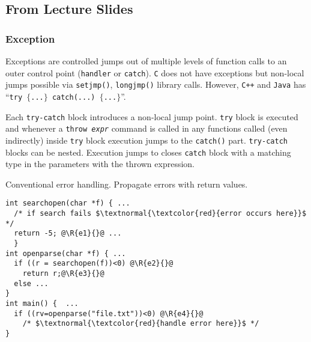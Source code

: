 \vspace*{\fill}
\columnbreak

\subsection{From Lecture Slides}
\label{subsec:from-lecture-slides}

\subsubsection{Exception}
\label{subsubsec:slide-exception}

Exceptions are controlled jumps out of multiple levels of function calls to an outer control point (\texttt{handler} or \texttt{catch}). \texttt{C} does not have exceptions but non-local jumps possible via \texttt{setjmp()}, \texttt{longjmp()} library calls. However, \texttt{C++} and \texttt{Java} has ``\texttt{try $\{$...$\}$ catch(...) $\{$...$\}$}''.

Each \texttt{try-catch} block introduces a non-local jump point. \texttt{try} block is executed and whenever a \texttt{throw {\em expr\/}} command is called in any functions called (even indirectly) inside \texttt{try}  block execution jumps to the \texttt{catch()} part. \texttt{try-catch} blocks can be nested. Execution jumps to closes \texttt{catch} block with a matching type in the parameters with the thrown expression.

\noindent Conventional error handling. Propagate errors with return values.
\begin{listing}[H]

\begin{verbatim}
int searchopen(char *f) { ...
  /* if search fails $\textnormal{\textcolor{red}{error occurs here}}$ */
  return -5; @\R{e1}{}@ ...
  }
int openparse(char *f) { ...
  if ((r = searchopen(f))<0) @\R{e2}{}@
    return r;@\R{e3}{}@
  else ...
}
int main() {  ...
  if ((rv=openparse("file.txt"))<0) @\R{e4}{}@
    /* $\textnormal{\textcolor{red}{handle error here}}$ */
}
\end{verbatim}


\caption{}
\label{code:code5}
\end{listing}

